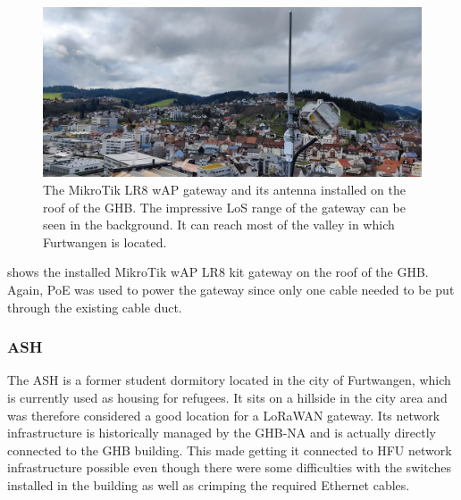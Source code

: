 \begin{figure}[htbp]
    \centering
    \includegraphics[width=1\textwidth]{pictures/hardware/gateway-deployment/lr8_ghb_installation.jpg}
    \caption{
        The MikroTik LR8 wAP gateway and its antenna installed on the roof of the \ac{GHB}.
        The impressive \ac{LoS} range of the gateway can be seen in the background.
        It can reach most of the valley in which Furtwangen is located.
    }\label{pic:mikrotik-gateway-ghb-installation}
\end{figure}

 shows the installed MikroTik wAP LR8 kit gateway on the roof of the \ac{GHB}.
Again, \ac{PoE} was used to power the gateway since only one cable needed to be put through the existing cable duct.

\subsubsection{\acf{ASH}}

The \ac{ASH} is a former student dormitory located in the city of Furtwangen, which is currently used as housing for refugees.
It sits on a hillside in the city area and was therefore considered a good location for a \ac{LoRaWAN} gateway.
Its network infrastructure is historically managed by the \acl{GHB-NA} and is actually directly connected to the \ac{GHB} building.
This made getting it connected to \ac{HFU} network infrastructure possible even though there were some difficulties with the switches installed in the building as well as crimping the required Ethernet cables.

